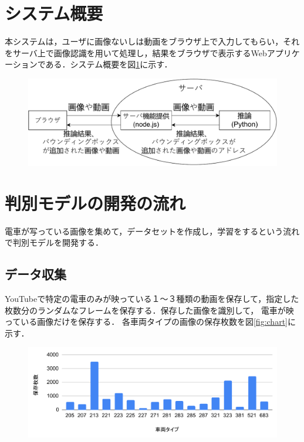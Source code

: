 \begin{multicols*}{2}
\section{システム概要}
本システムは，ユーザに画像ないしは動画をブラウザ上で入力してもらい，それをサーバ上で画像認識を用いて処理し，結果をブラウザで表示するWebアプリケーションである．システム概要を図\ref{abc}に示す．
\begin{figure} %
	\label{abc}
	\centering
	\includegraphics[width=\linewidth]{obj/sys_gaiyou1.pdf}
\end{figure}


\section{判別モデルの開発の流れ}
電車が写っている画像を集めて，データセットを作成し，学習をするという流れで判別モデルを開発する．

\subsection{データ収集}
	YouTubeで特定の電車のみが映っている１〜３種類の動画を保存して，指定した枚数分のランダムなフレームを保存する．保存した画像を識別して，	電車が映っている画像だけを保存する．
各車両タイプの画像の保存枚数を図\ref{fig:chart}に示す．

\begin{figure}
	\centering
	\includegraphics[width=\linewidth]{obj/chart1.pdf}
\end{figure}

\end{multicols*}
